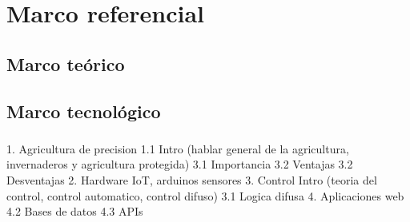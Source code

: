 \section{Marco referencial}











\subsection{Marco teórico}


\subsection{Marco tecnológico}


\subsubsection{}







1. Agricultura de precision
    1.1 Intro (hablar general de la agricultura, invernaderos y agricultura protegida)
    3.1 Importancia
    3.2 Ventajas
    3.2 Desventajas %
2. Hardware 
    IoT, arduinos sensores
3. Control
    Intro (teoria del control, control automatico, control difuso)
    3.1 Logica difusa
4. Aplicaciones web
    4.2 Bases de datos
    4.3 APIs

